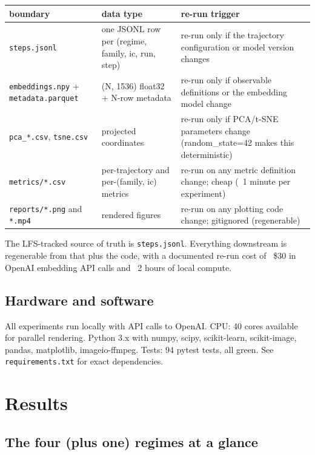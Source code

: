 \documentclass{article}
\theoremstyle{plain}
\theoremstyle{definition}
\begin{document}
\begin{table}[h!]
\centering
\small
\begin{tabular}{lll}
\toprule
boundary & data type & re-run trigger \\
\midrule
\texttt{steps.jsonl} & one JSONL row per (regime, family, ic, run, step) & re-run only if the trajectory configuration or model version changes \\
\texttt{embeddings.npy} + \texttt{metadata.parquet} & (N, 1536) float32 + N-row metadata & re-run only if observable definitions or the embedding model change \\
\texttt{pca\_*.csv}, \texttt{tsne.csv} & projected coordinates & re-run only if PCA/t-SNE parameters change (random\_state=42 makes this deterministic) \\
\texttt{metrics/*.csv} & per-trajectory and per-(family, ic) metrics & re-run on any metric definition change; cheap (~1 minute per experiment) \\
\texttt{reports/*.png} and \texttt{*.mp4} & rendered figures & re-run on any plotting code change; gitignored (regenerable) \\
\bottomrule
\end{tabular}
\end{table}

The LFS-tracked source of truth is \texttt{steps.jsonl}. Everything downstream
is regenerable from that plus the code, with a documented re-run cost
of ~\$30 in OpenAI embedding API calls and ~2 hours of local compute.

\subsection{Hardware and software}

All experiments run locally with API calls to OpenAI. CPU: 40 cores
available for parallel rendering. Python 3.x with numpy, scipy,
scikit-learn, scikit-image, pandas, matplotlib, imageio-ffmpeg. Tests:
94 pytest tests, all green. See \texttt{requirements.txt} for exact
dependencies.


\section{Results}

\subsection{The four (plus one) regimes at a glance}
\end{document}
